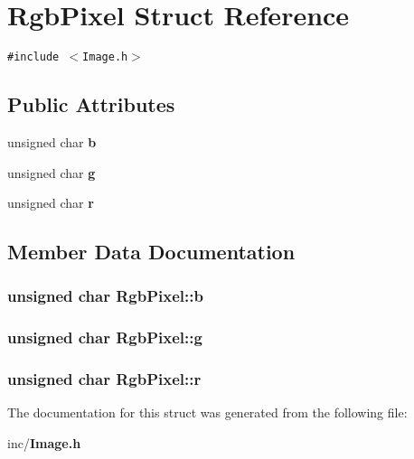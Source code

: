 \section{RgbPixel Struct Reference}
\label{structRgbPixel}
{\tt \#include $<$Image.h$>$}

\subsection*{Public Attributes}
\begin{CompactItemize}
\item 
unsigned char {\bf b}
\item 
unsigned char {\bf g}
\item 
unsigned char {\bf r}
\end{CompactItemize}


\subsection{Member Data Documentation}
\subsubsection{\setlength{\rightskip}{0pt plus 5cm}unsigned char {\bf RgbPixel::b}}\label{structRgbPixel_7328feddcf5c0f6161e142d5e5195f5d}


\subsubsection{\setlength{\rightskip}{0pt plus 5cm}unsigned char {\bf RgbPixel::g}}\label{structRgbPixel_c2fc04f5b5918f8649e3594829cdb172}


\subsubsection{\setlength{\rightskip}{0pt plus 5cm}unsigned char {\bf RgbPixel::r}}\label{structRgbPixel_0ab07798c8be7b2bdab0c0346edc640c}




The documentation for this struct was generated from the following file:\begin{CompactItemize}
\item 
inc/{\bf Image.h}\end{CompactItemize}
